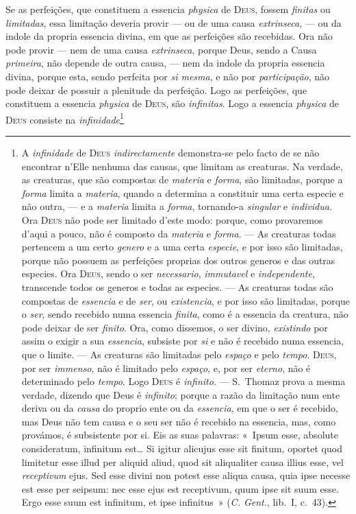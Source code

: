  Se as perfeições, que constituem a essencia \emph{physica} de \textsc{Deus},
fossem \emph{finitas} ou \emph{limitadas}, essa limitação deveria provir --- ou de uma
causa \emph{extrinseca}, --- ou da indole da propria essencia divina, em que as perfeições
são recebidas. Ora não pode provir --- nem de uma causa \emph{extrinseca}, porque Deus,
sendo a Causa \emph{primeira}, não depende de outra causa, --- nem da indole da propria
essencia divina, porque esta, sendo perfeita por \emph{si mesma}, e não por
\emph{participação}, não pode deixar de possuir a plenitude da perfeição. Logo as
perfeições, que constituem a essencia \emph{physica} de \textsc{Deus}, são
\emph{infinitas}. Logo a essencia \emph{physica} de \textsc{Deus} consiste na
\emph{infinidade}\footnote{A \emph{infinidade} de \textsc{Deus} \emph{indirectamente}
demonstra-se pelo facto de se não encontrar n'Elle nenhuma das causas, que limitam as
creaturas. Na verdade, as creaturas, que são compostas de \emph{materia} e \emph{forma},
são limitadas, porque a \emph{forma} limita a \emph{materia}, quando a determina a
constituir uma certa especie e não outra, --- e a \emph{materia} limita a \emph{forma},
tornando-a \emph{sin\-}\emph{gular} e \emph{individua}. Ora \textsc{Deus} não
pode ser limitado d'este modo: porque, como provaremos d'aqui a pouco, não é composto da
\emph{materia} e \emph{forma}. --- As creaturas todas pertencem a um certo \emph{genero} e
a uma certa \emph{especie}, e por isso são limitadas, porque não possuem as perfeições
proprias dos outros generos e das outras especies. Ora \textsc{Deus}, sendo o ser
\emph{necessario}, \emph{immutavel} e \emph{independente}, transcende todos os generos e
todas as especies. --- As creaturas todas são compostas de \emph{essencia} e de
\emph{ser}, ou \emph{existencia}, e por isso são limitadas, porque o \emph{ser}, sendo
recebido numa essencia \emph{finita}, como é a essencia da creatura, não pode deixar de
ser \emph{finito}. Ora, como dissemos, o ser divino, \emph{existindo} por assim o exigir a
sua \emph{essencia}, subsiste por \emph{si} e não é recebido numa essencia, que o limite.
--- As creaturas são limitadas pelo \emph{espaço} e pelo \emph{tempo}. \textsc{Deus}, por
ser \emph{immenso}, não é limitado pelo \emph{espaço}, e, por ser \emph{eterno}, não é
determinado pelo \emph{tempo}. Logo \textsc{Deus} é \emph{infinito}. --- S.~Thomaz prova a
mesma verdade, dizendo que Deus é \emph{infinito}; porque a razão da limitação num ente
deriva ou da \emph{causa} do proprio ente ou da \emph{essencia}, em que o ser é recebido,
mas Deus não tem causa e o seu ser não é recebido na essencia, mas, como provámos, é
subsistente por si. Eis as suas palavras: «~Ipsum esse, absolute consideratum, infinitum
est\dots{} Si igitur alicujus esse sit finitum, oportet quod limitetur esse illud per
aliquid aliud, quod sit aliqualiter causa illius esse, vel \emph{receptivum} ejus. Sed
esse divini non potest esse aliqua causa, quia ipse necesse est esse per seipsum: nec esse
ejus est receptivum, quum ipse sit suum esse. Ergo esse suum est infinitum, et ipse
infinitus~» (\emph{C. Gent.}, lib.~I, c.~43).

}
